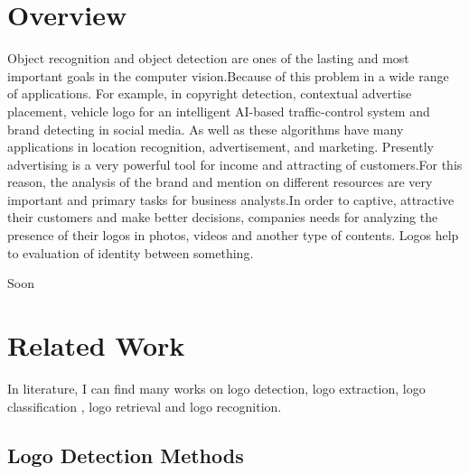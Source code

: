 \section{Overview} \label{sec:1.1}
\vspace{-0.5cm}
\noindent Object recognition and object detection are ones of the lasting and most important goals in the computer vision.Because of this problem in a wide range of applications. For example, in copyright detection, contextual advertise placement, vehicle logo for an intelligent AI-based traffic-control system and brand detecting in social media. As well as these algorithms have many applications in location recognition, advertisement, and marketing. Presently advertising is a very powerful tool for income and attracting of customers.For this reason, the analysis of the brand and mention on different resources are very important and primary tasks for business analysts.In order to captive, attractive their customers and make better decisions, companies needs for analyzing the presence of their logos in photos, videos and another type of contents. Logos help to evaluation of identity between something.

\vspace{-0.5cm}
\par
\noindent Soon

\vspace{-0.3cm}
\section{Related Work}\label{sec:1.2}
\vspace{-0.5cm}
\noindent In literature, I can find many works on logo detection, logo extraction, logo classification , logo retrieval and logo recognition.

\vspace{-0.3cm}


\subsection{Logo Detection Methods}\label{sec:1.2.1}
\vspace{-0.5cm}
